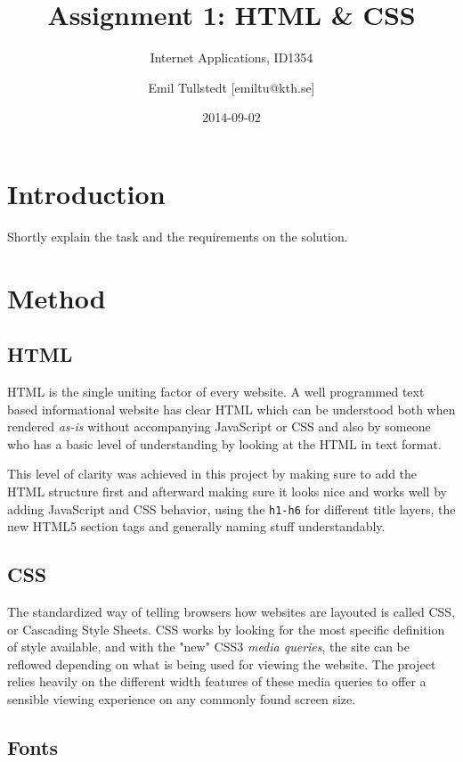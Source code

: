 \documentclass[a4paper]{scrartcl}
\title{Assignment 1: HTML \& CSS}
\subtitle{Internet Applications, ID1354}
\author{Emil Tullstedt [emiltu@kth.se]}
\date{2014-09-02}
\begin{document}
\maketitle

\section{Introduction}

Shortly explain the task and the requirements on the solution.

\section{Method}

\subsection{HTML}

HTML is the single uniting factor of every website. A well programmed text based informational website has clear HTML which can be understood both when rendered \textit{as-is} without accompanying JavaScript or CSS and also by someone who has a basic level of understanding by looking at the HTML in text format.

This level of clarity was achieved in this project by making sure to add the HTML structure first and afterward making sure it looks nice and works well by adding JavaScript and CSS behavior, using the \texttt{h1-h6} for different title layers, the new HTML5 section tags and generally naming stuff understandably.

\subsection{CSS}

The standardized way of telling browsers how websites are layouted is called CSS, or Cascading Style Sheets. CSS works by looking for the most specific definition of style available, and with the "new" CSS3 \textit{media queries}, the site can be reflowed depending on what is being used for viewing the website. The project relies heavily on the different width features of these media queries to offer a sensible viewing experience on any commonly found screen size.

\subsection{Fonts}
\label{subsec:Fonts}
\end{document}
